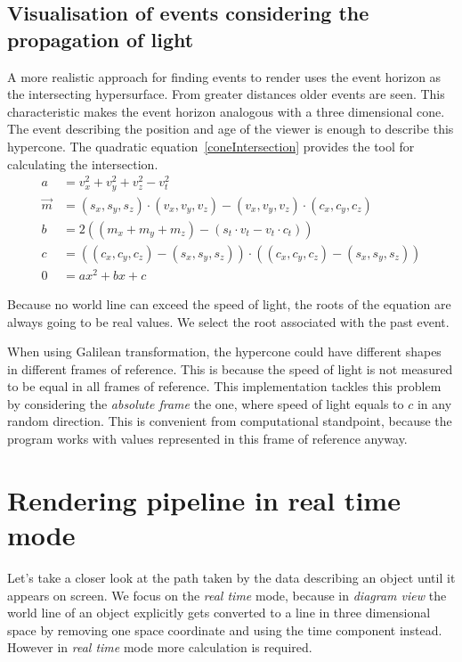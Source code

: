 \documentclass{egpubl}
\begin{document}
\subsection{Visualisation of events considering the propagation of light}
\label{visConsLight}
A more realistic approach for finding events to render uses the event horizon as the intersecting hypersurface. From greater distances older events are seen. This characteristic makes the event horizon analogous with a three dimensional cone. The  event describing the position and age of the viewer is enough to describe this hypercone. The quadratic equation~\ref{coneIntersection} provides the tool for calculating the intersection.
\begin{align}
\label{coneIntersection}
a &= v_x^2 + v_y^2 + v_z^2 - v_t^2\\
\vec{m} &= (s_x, s_y, s_z)\cdot{}(v_x, v_y, v_z) - (v_x, v_y, v_z)\cdot{}(c_x, c_y, c_z)\\
b &= 2((m_x + m_y + m_z) - (s_t\cdot{}v_t - v_t\cdot{}c_t))\\
c &= ((c_x, c_y, c_z) - (s_x, s_y, s_z))\cdot{}((c_x, c_y, c_z) - (s_x, s_y, s_z))\\
0 &=ax^2 + bx + c
\end{align}

Because no world line can exceed the speed of light, the roots of the equation are always going to be real values. We select the root associated with the past event. 

When using Galilean transformation, the hypercone could have different shapes in different frames of reference. This is because the speed of light is not measured to be equal in all frames of reference. This implementation tackles this problem by considering the \emph{absolute frame} the one, where speed of light equals to $c$ in any random direction. This is convenient from computational standpoint, because the program works with values represented in this frame of reference anyway.

\section{Rendering pipeline in real time mode}
Let's take a closer look at the path taken by the data describing an object until it appears on screen. We focus on the \emph{real time} mode, because in \emph{diagram view} the world line of an object explicitly gets converted to a line in three dimensional space by removing one space coordinate and using the time component instead. However in \emph{real time} mode more calculation is required.
\end{document}
